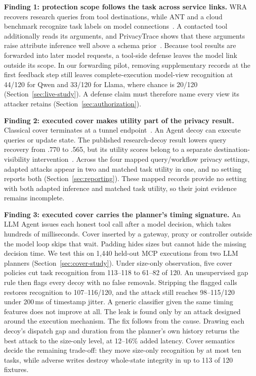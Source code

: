 \textbf{Finding 1: protection scope follows the task across service links.} WRA recovers research queries from tool destinations, while ANT and a cloud benchmark recognize task labels on model connections~\cite{jeong2026wra,li2026ant,pouryousef2026traffic}. A contacted tool additionally reads its arguments, and PrivacyTrace shows that these arguments raise attribute inference well above a schema prior~\cite{duan2026privacytrace}. Because tool results are forwarded into later model requests, a tool-side defense leaves the model link outside its scope. In our forwarding pilot, removing supplementary records at the first feedback step still leaves complete-execution model-view recognition at 44/120 for Qwen and 33/120 for Llama, where chance is 20/120 (Section~\ref{sec:live-study}). A defense claim must therefore name every view its attacker retains (Section~\ref{sec:authorization}).

\textbf{Finding 2: executed cover makes utility part of the privacy result.} Classical cover terminates at a tunnel endpoint~\cite{apthorpe2019stp}. An Agent decoy can execute queries or update state. The published research-decoy result lowers query recovery from .770 to .565, but its utility scores belong to a separate destination-visibility intervention~\cite{jeong2026wra}. Across the four mapped query/workflow privacy settings, adapted attacks appear in two and matched task utility in one, and no setting reports both (Section~\ref{sec:reporting}). These mapped records provide no setting with both adapted inference and matched task utility, so their joint evidence remains incomplete.

\textbf{Finding 3: executed cover carries the planner's timing signature.} An LLM Agent issues each honest tool call after a model decision, which takes hundreds of milliseconds. Cover inserted by a gateway, proxy or controller outside the model loop skips that wait. Padding hides sizes but cannot hide the missing decision time. We test this on 1,440 held-out MCP executions from two LLM planners (Section~\ref{sec:cover-study}). Under size-only observation, five cover policies cut task recognition from 113--118 to 61--82 of 120. An unsupervised gap rule then flags every decoy with no false removals. Stripping the flagged calls restores recognition to 107--116/120, and the attack still reaches 98--115/120 under 200\,ms of timestamp jitter. A generic classifier given the same timing features does not improve at all. The leak is found only by an attack designed around the execution mechanism. The fix follows from the cause. Drawing each decoy's dispatch gap and duration from the planner's own history returns the best attack to the size-only level, at 12--16\% added latency. Cover semantics decide the remaining trade-off: they move size-only recognition by at most ten tasks, while adverse writes destroy whole-state integrity in up to 113 of 120 fixtures.

